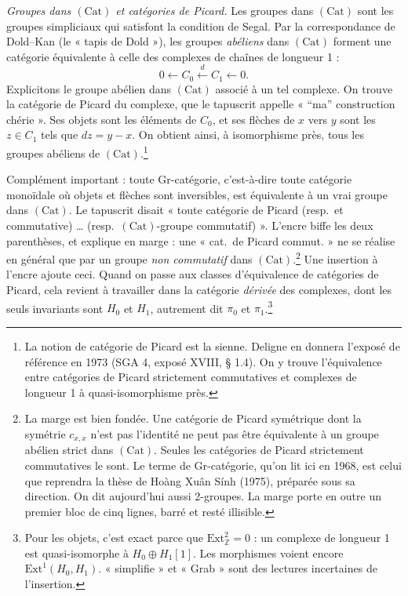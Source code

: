 \documentclass[11pt,a4paper]{article}
\begin{document}
\emph{Groupes dans $(\mathrm{Cat})$ et catégories de Picard.} Les groupes dans
$(\mathrm{Cat})$ sont les groupes simpliciaux qui satisfont la condition de
Segal. Par la correspondance de Dold--Kan (le « tapis de Dold »), les groupes
\emph{abéliens} dans $(\mathrm{Cat})$ forment une catégorie équivalente à celle
des complexes de chaînes de longueur 1 :
\[
0 \longleftarrow C_0 \xleftarrow{\ d\ } C_1 \longleftarrow 0 .
\]
Explicitons le groupe abélien dans $(\mathrm{Cat})$ associé à un tel complexe.
On trouve la catégorie de Picard du complexe, que le tapuscrit appelle « “ma”
construction chérie ». Ses objets sont les éléments de $C_0$, et ses flèches de
$x$ vers $y$ sont les $z \in C_1$ tels que $dz = y - x$. On obtient ainsi, à
isomorphisme près, tous les groupes abéliens de $(\mathrm{Cat})$.\footnote{La
notion de catégorie de Picard est la sienne. Deligne en donnera l'exposé de
référence en 1973 (SGA 4, exposé XVIII, § 1.4). On y trouve l'équivalence entre
catégories de Picard strictement commutatives et complexes de longueur 1 à
quasi-isomorphisme près.}

Complément important : toute Gr-catégorie, c'est-à-dire toute catégorie
monoïdale où objets et flèches sont inversibles, est équivalente à un vrai
groupe dans $(\mathrm{Cat})$. Le tapuscrit disait « toute catégorie de Picard
(resp.\ et commutative) … (resp.\ $(\mathrm{Cat})$-groupe commutatif) ».
L'encre biffe les deux parenthèses, et explique en marge : une « cat.\ de
Picard commut. » ne se réalise en général que par un groupe \emph{non
commutatif} dans $(\mathrm{Cat})$.\footnote{La marge est bien fondée. Une
catégorie de Picard symétrique dont la symétrie $c_{x,x}$ n'est pas l'identité
ne peut pas être équivalente à un groupe abélien strict dans $(\mathrm{Cat})$.
Seules les catégories de Picard strictement commutatives le sont. Le terme de
Gr-catégorie, qu'on lit ici en 1968, est celui que reprendra la thèse de Hoàng
Xuân Sính (1975), préparée sous sa direction. On dit aujourd'hui aussi
2-groupes. La marge porte
en outre un premier bloc de cinq lignes, barré et resté illisible.} Une
insertion à l'encre ajoute ceci. Quand on passe aux classes d'équivalence de
catégories de Picard, cela revient à travailler dans la catégorie
\emph{dérivée} des complexes, dont les seuls invariants sont $H_0$ et $H_1$,
autrement dit $\pi_0$ et $\pi_1$.\footnote{Pour les objets, c'est exact
parce que $\mathrm{Ext}^{2}_{\mathbb{Z}} = 0$ : un complexe de longueur 1 est
quasi-isomorphe à $H_0 \oplus H_1[1]$. Les morphismes voient encore
$\mathrm{Ext}^{1}(H_0, H_1)$. « simplifie » et « Grab » sont des lectures
incertaines de l'insertion.}
\end{document}
